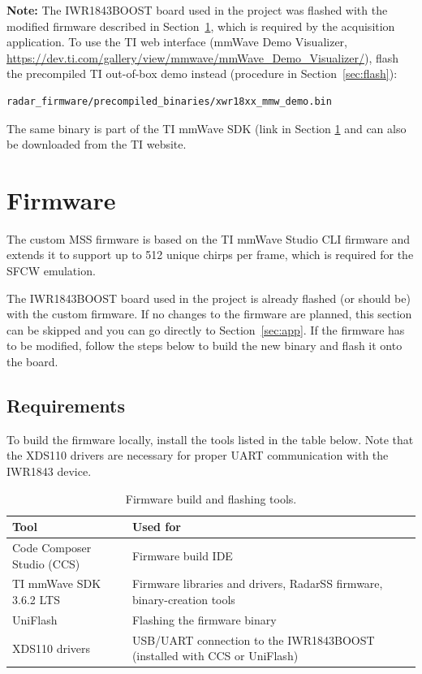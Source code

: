 \documentclass[12pt, a4paper]{article}
\begin{document}
\medskip
\noindent\textbf{Note:} The IWR1843BOOST board used in the project was flashed with the modified firmware
described in Section~\ref{sec:firmware}, which is required by the acquisition application.
To use the TI web interface (mmWave Demo Visualizer,
\url{https://dev.ti.com/gallery/view/mmwave/mmWave_Demo_Visualizer/}), flash the
precompiled TI out-of-box demo instead (procedure in Section~\ref{sec:flash}):
\begin{lstlisting}
radar_firmware/precompiled_binaries/xwr18xx_mmw_demo.bin
\end{lstlisting}
The same binary is part of the TI mmWave SDK (link in Section \ref{sec:firmware} and can also be downloaded from the TI
website.





\newpage
\section{Firmware}
\label{sec:firmware}

The custom MSS firmware is based on the TI mmWave Studio CLI firmware and extends it
to support up to 512 unique chirps per frame, which is required for the SFCW emulation.

The IWR1843BOOST board used in the project is already flashed (or should be) with the custom firmware.
If no changes to the firmware are planned, this section can be skipped and you can go
directly to Section~\ref{sec:app}. If the firmware has to be modified, follow the steps
below to build the new binary and flash it onto the board.

\subsection{Requirements}
To build the firmware locally, install the tools listed in the table below.
Note that the XDS110 drivers are necessary for proper UART communication with the IWR1843 device.
\begin{table}[H]
\centering
\caption{Firmware build and flashing tools.}
\begin{tabularx}{\textwidth}{|l|X|}
\hline
\textbf{Tool} & \textbf{Used for} \\
\hline
Code Composer Studio (CCS) & Firmware build IDE \\
\hline
TI mmWave SDK 3.6.2 LTS & Firmware libraries and drivers, RadarSS firmware, binary-creation tools \\
\hline
UniFlash & Flashing the firmware binary \\
\hline
XDS110 drivers & USB/UART connection to the IWR1843BOOST (installed with CCS or UniFlash) \\
\hline
\end{tabularx}
\end{table}
\end{document}
